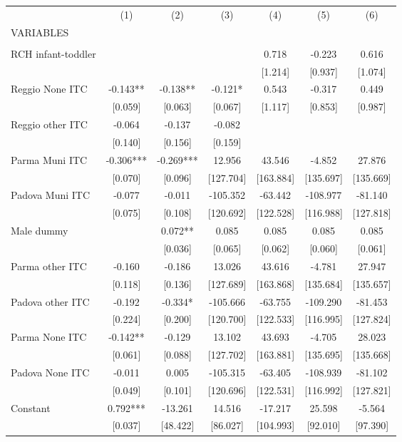 \begin{tabular}{lcccccc} \hline
 & (1) & (2) & (3) & (4) & (5) & (6) \\
VARIABLES &  &  &  &  &  &  \\ \hline
 &  &  &  &  &  &  \\
RCH infant-toddler &  &  &  & 0.718 & -0.223 & 0.616 \\
 &  &  &  & [1.214] & [0.937] & [1.074] \\
Reggio None ITC & -0.143** & -0.138** & -0.121* & 0.543 & -0.317 & 0.449 \\
 & [0.059] & [0.063] & [0.067] & [1.117] & [0.853] & [0.987] \\
Reggio other ITC & -0.064 & -0.137 & -0.082 &  &  &  \\
 & [0.140] & [0.156] & [0.159] &  &  &  \\
Parma Muni ITC & -0.306*** & -0.269*** & 12.956 & 43.546 & -4.852 & 27.876 \\
 & [0.070] & [0.096] & [127.704] & [163.884] & [135.697] & [135.669] \\
Padova Muni ITC & -0.077 & -0.011 & -105.352 & -63.442 & -108.977 & -81.140 \\
 & [0.075] & [0.108] & [120.692] & [122.528] & [116.988] & [127.818] \\
Male dummy &  & 0.072** & 0.085 & 0.085 & 0.085 & 0.085 \\
 &  & [0.036] & [0.065] & [0.062] & [0.060] & [0.061] \\
Parma other ITC & -0.160 & -0.186 & 13.026 & 43.616 & -4.781 & 27.947 \\
 & [0.118] & [0.136] & [127.689] & [163.868] & [135.684] & [135.657] \\
Padova other ITC & -0.192 & -0.334* & -105.666 & -63.755 & -109.290 & -81.453 \\
 & [0.224] & [0.200] & [120.700] & [122.533] & [116.995] & [127.824] \\
Parma None ITC & -0.142** & -0.129 & 13.102 & 43.693 & -4.705 & 28.023 \\
 & [0.061] & [0.088] & [127.702] & [163.881] & [135.695] & [135.668] \\
Padova None ITC & -0.011 & 0.005 & -105.315 & -63.405 & -108.939 & -81.102 \\
 & [0.049] & [0.101] & [120.696] & [122.531] & [116.992] & [127.821] \\
Constant & 0.792*** & -13.261 & 14.516 & -17.217 & 25.598 & -5.564 \\
 & [0.037] & [48.422] & [86.027] & [104.993] & [92.010] & [97.390] \\

\end{tabular}
